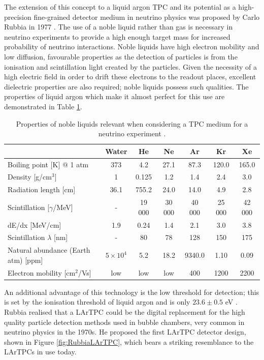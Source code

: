 The extension of this concept to a liquid argon TPC and its potential as a high-precision fine-grained detector medium in neutrino physics was proposed by Carlo Rubbia in 1977 \cite{Rubbia1977}.  The use of a noble liquid rather than gas is necessary in neutrino experiments to provide a high enough target mass for increased probability of neutrino interactions.  Noble liquids have high electron mobility and low diffusion, favourable properties as the detection of particles is from the ionisation and scintillation light created by the particles.  Given the necessity of a high electric field in order to drift these electrons to the readout places, excellent dielectric properties are also required; noble liquids possess such qualities.  The properties of liquid argon which make it almost perfect for this use are demonstrated in Table \ref{tab:NobleProperties}.

\begin{table}
  \caption{Properties of noble liquids relevant when considering a TPC medium for a neutrino experiment \cite{Soderberg2008}.}
  \label{tab:NobleProperties}
  \centering
  \begin{tabular}{ l c c c c c c }
    \toprule
     & Water & He & Ne & \color{red} Ar & Kr & Xe \\
    \midrule
    Boiling point [K] @ 1 atm & 373 & 4.2 & 27.1 & \color{red} 87.3 & 120.0 & 165.0 \\
    Density [g/cm$^3$] & 1 & 0.125 & 1.2 & \color{red} 1.4 & 2.4 & 3.0 \\
    Radiation length [cm] & 36.1 & 755.2 & 24.0 & \color{red} 14.0 & 4.9 & 2.8 \\
    Scintillation [$\gamma$/MeV] & - & 19 000 & 30 000 & \color{red} 40 000 & 25 000 & 42 000 \\
    dE/dx [MeV/cm] & 1.9 & 0.24 & 1.4 & \color{red} 2.1 & 3.0 & 3.8 \\
    Scintillation $\lambda$ [nm] & - & 80 & 78 & \color{red} 128 & 150 & 175 \\
    Natural abundance (Earth atm) [ppm] & $5\times 10^4$ & 5.2 & 18.2 & \color{red} 9340.0 & 1.10 & 0.09 \\
    Electron mobility [cm$^2$/Vs] & low & low & low & \color{red} 400 & 1200 & 2200 \\
    \bottomrule
  \end{tabular}
\end{table}

An additional advantage of this technology is the low threshold for detection; this is set by the ionisation threshold of liquid argon and is only $23.6 \pm 0.5$ eV \cite{Chepel2013}.  Rubbia realised that a LArTPC could be the digital replacement for the high quality particle detection methods used in bubble chambers, very common in neutrino physics in the 1970s.  He proposed the first LArTPC detector design, shown in Figure \ref{fig:RubbiaLArTPC}, which bears a striking resemblance to the LArTPCs in use today.

